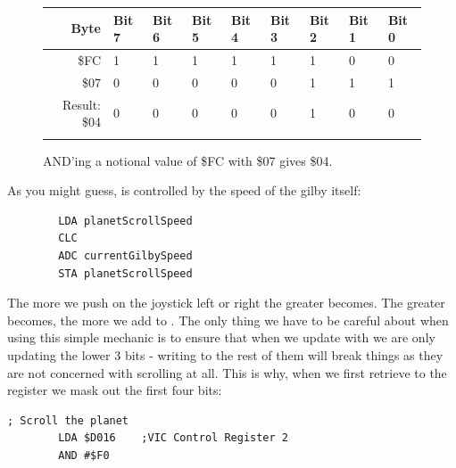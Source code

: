 \begin{figure}[H]
  {
    \setlength{\tabcolsep}{3.0pt}
    \setlength\cmidrulewidth{\heavyrulewidth} %
    \begin{adjustbox}{width=6cm,center}

      \begin{tabular}{rllllllll}
        \toprule
        Byte & Bit 7 & Bit 6 & Bit 5 & Bit 4 & Bit 3 & Bit 2 & Bit 1 & Bit 0        \\
        \midrule
        \$FC & 1 & 1 & 1 & 1 & 1 & 1 & 0 & 0 \\
        \$07 & 0 & 0 & 0 & 0 & 0 & 1 & 1 & 1 \\
        \midrule
        Result: \$04 & 0 & 0 & 0 & 0 & 0 & 1 & 0 & 0 \\
        \addlinespace
        \bottomrule
      \end{tabular}

    \end{adjustbox}

  }\caption*{AND'ing a notional value of \$FC with \$07 gives \$04.}
\end{figure}

As you might guess,  is controlled by the speed of the gilby itself:

\begin{lstlisting}
        LDA planetScrollSpeed
        CLC
        ADC currentGilbySpeed
        STA planetScrollSpeed
\end{lstlisting}

The more we push on the joystick left or right the greater  becomes. The
greater  becomes, the more we add to . The only
thing we have to be careful about when using this simple mechanic is to ensure that when we update
 with  we are only updating the lower 3 bits - writing to the
rest of them will break things as they are not concerned with scrolling at all. This is why, when
we first retrieve  to the  register we mask out the first four bits:

\begin{lstlisting}[]
        ; Scroll the planet
        LDA $D016    ;VIC Control Register 2
        AND #$F0
\end{lstlisting}


